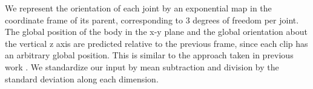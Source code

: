\documentclass[10pt,twocolumn,letterpaper]{article}
\begin{document}
We represent the orientation of each joint by an exponential map in the coordinate frame of its parent, corresponding to 3 degrees of freedom per joint. The global position of the body in the x-y plane and the global orientation about the vertical z axis are predicted relative to the previous frame, since each clip has an arbitrary global position. This is similar to the approach taken in previous work \cite{thr-mhmub-06}. We standardize our input by mean subtraction and division by the standard deviation along each dimension. 
\end{document}
